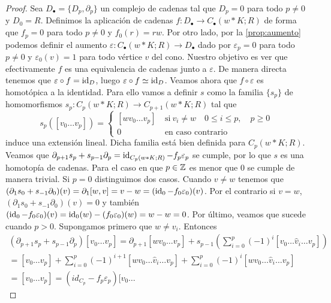 \begin{proof}
	Sea $D_{\bullet}= \{D_{p}, \partial_{p}\}$ un complejo de cadenas tal que $D_{p}
	= 0$ para todo $p \neq 0$ y $D_{0}= R$. Definimos la aplicación de cadenas
	$f: D_{\bullet}\to C_{\bullet}(w \ast K;R)$ de forma que $f_{p}= 0$ para todo
	$p \neq 0$ y $f_{0}(r)=rw$. Por otro lado, por la \autoref{prop:aumento}
	podemos definir el aumento
	$\varepsilon: C_{\bullet}(w \ast K;R) \to D_{\bullet}$ dado por
	$\varepsilon_{p}=0$ para todo $p \neq 0$ y $\varepsilon_{0}(v) = 1$ para todo
	vértice $v$ del cono. Nuestro objetivo es ver que efectivamente $f$ es una equivalencia
	de cadenas junto a $\varepsilon$. De manera directa tenemos que
	$\varepsilon \circ f = \operatorname{id}_{D}$, luego $\varepsilon \circ f \simeq \operatorname{id}_{D}$.
	Veamos ahora que $f \circ \varepsilon$ es homotópica a la identidad. Para ello
	vamos a definir $s$ como la familia $\{s_{p}\}$ de homomorfismos $s_{p}: C_{p}(
	w \ast K;R) \to C_{p+1}(w \ast K;R)$ tal que
	\[
	s_{p}([v_{0}\ldots v_{p}]) =
	\begin{cases}
		[wv_{0}\ldots v_{p}] \  & \text{si}\ v_{i}\neq w \quad 0 \leq i \leq p,\quad p \geq 0 \\
		0 \                     & \text{en caso contrario}
	\end{cases}
	\]
	induce una extensión lineal. Dicha familia está bien definida para
	$C_{p}(w \ast K;R)$. Veamos que $\partial_{p+1}s_{p}+ s_{p-1}\partial_{p}= \operatorname{id}_{C_p(w
		\ast K;R)}- f_{p}\varepsilon_{p}$ se cumple, por lo que $s$ es una homotopía
	de cadenas. Para el caso en que $p \in \mathbb{Z}$ es menor que $0$ se cumple de manera
	trivial. Si $p = 0$ distinguimos dos casos. Cuando $v \neq w$ tenemos que $(\partial
	_{1}s_{0}+s_{-1}\partial_{0})(v) = \partial_{1}[w,v] = v-w = (\operatorname{id}_{0}- f_{0}\varepsilon
	_{0})(v)$. Por el contrario si $v = w$, $(\partial_{1}s_{0}+s_{-1}\partial_{0})
	(v) = 0$ y también $(\operatorname{id}_{0}- f_{0}\varepsilon_{0})(v) = \operatorname{id}_{0}(w) - (f_{0}\varepsilon
	_{0})(w) = w - w = 0$. Por último, veamos que sucede cuando $p > 0$.
	Supongamos primero que $w \neq v_{i}$. Entonces
	\begin{gather*}
		(\partial_{p+1}s_{p}+ s_{p-1}\partial_{p})[v_{0}\ldots v_{p}] =\partial_{p+1}
		[wv_{0}\ldots v_{p}]+s_{p-1}\left(\sum_{i=0}^{p}(-1)^{i}[v_{0}\ldots\hat{v}_{i}
		\ldots v_{p}]\right) \\ =[v_{0}\ldots v_{p}]+\sum_{i=0}^{p}(-1)^{i+1}[wv_{0}\ldots
		\hat{v}_{i}\ldots v_{p}]+\sum_{i=0}^{p}(-1)^{i}[wv_{0}\ldots\hat{v}_{i}\ldots
		v_{p}] \\ =[v_{0}\ldots v_{p}]=(id_{C_{p}}-f_{p}\varepsilon_{p})[v_{0}\ldots

\end{gather*}
\end{proof}
